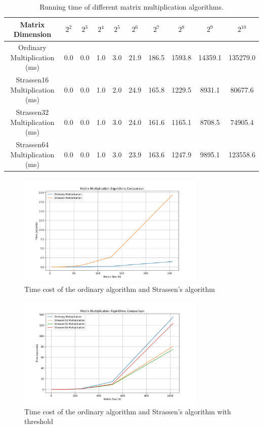 \documentclass[UTF8]{ctexart}
\begin{document}
\medskip
\begin{table}[h]
    \centering
    \begin{tabular}{|c|c|c|c|c|c|c|c|c|c|}
    \hline
    Matrix Dimension & $2^2$ & $2^3$ & $2^4$ & $2^5$ & $2^6$ & $2^7$ & $2^8$ & $2^9$ & $2^{10}$ \\
    \hline
    Ordinary Multiplication (ms) & 0.0 & 0.0 & 1.0 & 3.0 & 21.9 & 186.5 & 1593.8 & 14359.1 & 135279.0 \\
    \hline
    Strassen16 Multiplication (ms) & 0.0 & 0.0 & 1.0 & 2.0 & 24.9 & 165.8 & 1229.5 & 8931.1 & 80677.6 \\
    \hline
    Strassen32 Multiplication (ms) & 0.0 & 0.0 & 1.0 & 3.0 & 24.0 & 161.6 & 1165.1 & 8708.5 & 74905.4 \\
    \hline
    Strassen64 Multiplication (ms) & 0.0 & 0.0 & 1.0 & 3.0 & 23.9 & 163.6 & 1247.9 & 9895.1 & 123558.6 \\
    \hline
    \end{tabular}
    \caption{Running time of different matrix multiplication algorithms.}
\end{table}  
\begin{figure}[H]
    \centering
    \includegraphics[width=0.8\textwidth]{Strassen_raw.png}
    \caption{Time cost of the ordinary algorithm and Strassen's algorithm}
\end{figure}
\medskip
\begin{figure}[H]
    \centering
    \includegraphics[width=0.8\textwidth]{Strassen_revised.png}
    \caption{Time cost of the ordinary algorithm and Strassen's algorithm with threshold}
\end{figure}
\end{document}
